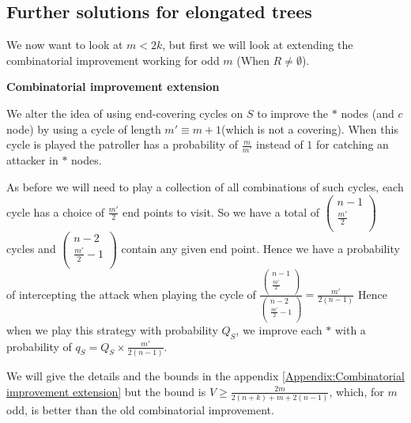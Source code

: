 \documentclass[a4paper,10pt]{article}
\theoremstyle{definition}
\theoremstyle{definition}
\theoremstyle{remark}
\theoremstyle{definition}
\begin{document}
\subsection{Further solutions for elongated trees}
\label{Section:Further solutions for elongated trees}

We now want to look at $m < 2k$, but first we will look at extending the combinatorial improvement working for odd $m$ (When $R \neq \emptyset$).

\textbf{Combinatorial improvement extension}

We alter the idea of using end-covering cycles on $S$ to improve the $*$ nodes (and $c$ node) by using a cycle of length $m' \equiv m+1$(which is not a covering). When this cycle is played the patroller has a probability of $\frac{m}{m'}$ instead of $1$ for catching an attacker in $*$ nodes.

As before we will need to play a collection of all combinations of such cycles, each cycle has a choice of $\frac{m'}{2}$ end points to visit. So we have a total of $\left( \begin{array}{c}
n-1 \\
\frac{m'}{2} \\
\end{array} \right)
$ cycles 
and  $\left( \begin{array}{c}
n-2 \\
\frac{m'}{2}-1 \\
\end{array} \right)
$
contain any given end point. Hence we have a probability of intercepting the attack when playing the cycle of $\frac{\left( \begin{array}{c}
n-1 \\
\frac{m'}{2} \\
\end{array} \right)}{\left( \begin{array}{c}
n-2 \\
\frac{m'}{2}-1 \\
\end{array} \right)}=
\frac{m'}{2(n-1)}
$
Hence when we play this strategy with probability $Q_{S}$, we improve each $*$ with a probability of $q_{S}=Q_{S} \times \frac{m'}{2(n-1)}$.

We will give the details and the bounds in the appendix \ref{Appendix:Combinatorial improvement extension} but the bound is $V \geq \frac{2m}{2(n+k)+m+2(n-1)}$, which, for $m$ odd, is better than the old combinatorial improvement.
\end{document}
